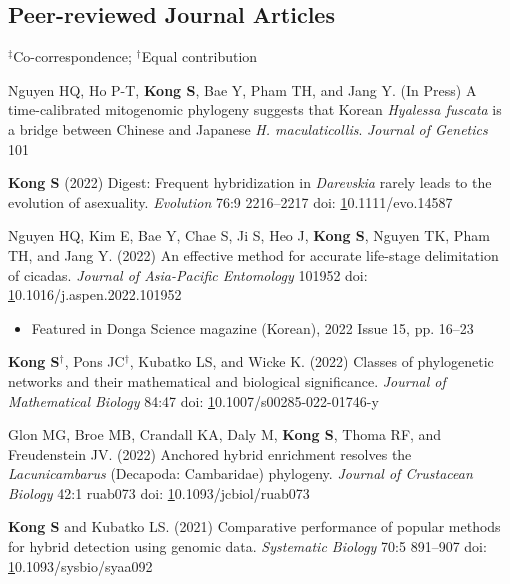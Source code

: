 \documentclass[11pt]{article}
\begin{document}

\subsection*{Peer-reviewed Journal Articles}
$^\ddag$Co-correspondence; $^\dag$Equal contribution
\begin{etaremune}

\item Nguyen HQ, Ho P-T, \textbf{Kong S}, Bae Y, Pham TH, and Jang Y. (In Press) A time-calibrated mitogenomic phylogeny suggests that Korean \textit{Hyalessa fuscata} is a bridge between Chinese and Japanese \textit{H. maculaticollis}. \textit{Journal of Genetics} 101


\item \textbf{Kong S} (2022) Digest: Frequent hybridization in \textit{Darevskia} rarely leads to the evolution of asexuality. \textit{Evolution} 76:9 2216--2217 doi: \href{https://doi.org/10.1111/evo.14587}10.1111/evo.14587

\item Nguyen HQ, Kim E, Bae Y, Chae S, Ji S, Heo J, \textbf{Kong S}, Nguyen TK, Pham TH, and Jang Y. (2022) An effective method for accurate life-stage delimitation of cicadas. \textit{Journal of Asia-Pacific Entomology} 101952 doi: \href{https://doi.org/10.1016/j.aspen.2022.101952}10.1016/j.aspen.2022.101952
	\begin{itemize}\item Featured in Donga Science magazine (Korean), 2022 Issue 15, pp. 16--23 \end{itemize}

\item \textbf{Kong S}$^\dag$, Pons JC$^\dag$, Kubatko LS, and Wicke K. (2022) Classes of phylogenetic networks and their mathematical and biological significance. \textit{Journal of Mathematical Biology} 84:47 doi: \href{https://doi.org/10.1007/s00285-022-01746-y}10.1007/s00285-022-01746-y

\item Glon MG, Broe MB, Crandall KA, Daly M, \textbf{Kong S}, Thoma RF, and Freudenstein JV. (2022) Anchored hybrid enrichment resolves the \textit{Lacunicambarus} (Decapoda: Cambaridae) phylogeny. \textit{Journal of Crustacean Biology} 42:1 ruab073 doi: \href{https://doi.org/10.1093/jcbiol/ruab073}10.1093/jcbiol/ruab073

\item \textbf{Kong S} and Kubatko LS. (2021) Comparative performance of popular methods for hybrid detection using genomic data. \textit {Systematic Biology} 70:5 891–907 doi: \href{https://doi.org/10.1093/sysbio/syaa092}10.1093/sysbio/syaa092


\end{etaremune}
\end{document}
